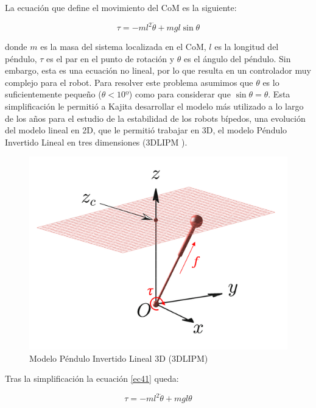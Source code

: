 La ecuación que define el movimiento del CoM es la siguiente:

\begin{equation}
\tau = - ml^2\ddot{\theta}+mgl\sin\theta
\label{ec41}
\end{equation}

donde $m$ es la masa del sistema localizada en el CoM, $l$ es la longitud del péndulo, $\tau$ es el par en el punto de rotación y $\theta$ es el ángulo del péndulo. Sin embargo, esta es una ecuación no lineal, por lo que resulta en un controlador muy complejo para el robot. Para resolver este problema asumimos que $\theta$ es lo suficientemente pequeño ($\theta<10º$) como para considerar que $\sin\theta=\theta$. Esta simplificación le permitió a Kajita desarrollar el modelo más utilizado a lo largo de los años para el estudio de la estabilidad de los robots bípedos, una evolución del modelo lineal en 2D, que le permitió trabajar en 3D, el modelo Péndulo Invertido Lineal en tres dimensiones (3DLIPM%
)\cite{ref15}.

\begin{figure}[H]
\centering
\includegraphics[scale=0.5]{imagenes/apartado_4/43_3D_linear_inverted_pendulum_model}
\caption{Modelo Péndulo Invertido Lineal 3D (3DLIPM)}
\label{figura43}
\end{figure}

Tras la simplificación la ecuación \ref{ec41} queda:

\begin{equation}
\tau = - ml^2\ddot{\theta}+mgl\theta
\label{ec42}
\end{equation}

